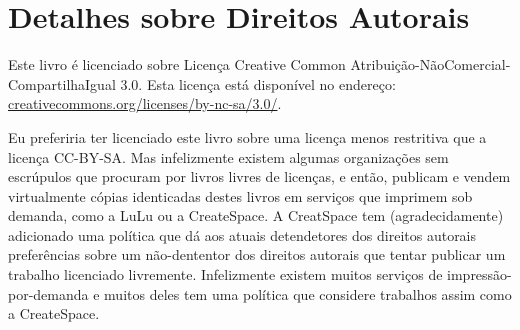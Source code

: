 
\chapter{Detalhes sobre Direitos Autorais}

Este livro é licenciado sobre Licença Creative Common
Atribuição-NãoComercial-CompartilhaIgual 3.0. Esta licença está disponível
no endereço: \url{creativecommons.org/licenses/by-nc-sa/3.0/}.


Eu preferiria ter licenciado este livro sobre uma licença menos restritiva 
que a licença CC-BY-SA. Mas infelizmente existem algumas organizações sem
escrúpulos que procuram por livros livres de licenças, e então, publicam e 
vendem virtualmente cópias identicadas destes livros em serviços que imprimem
sob demanda, como a LuLu ou a CreateSpace. A CreatSpace tem (agradecidamente)
adicionado uma política que dá aos atuais detendetores dos direitos autorais 
preferências sobre um não-dententor dos direitos autorais que tentar publicar 
um trabalho licenciado livremente. Infelizmente existem muitos serviços de 
impressão-por-demanda e muitos deles tem uma política que considere trabalhos
assim como a CreateSpace.


